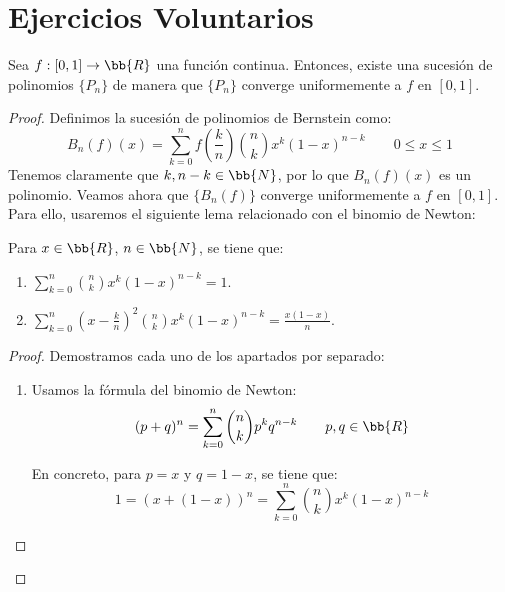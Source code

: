 \chapter{Ejercicios Voluntarios}

\begin{teo}
    Sea $f:[0,1]\to \bb{R}$ una función continua. Entonces, existe una sucesión de polinomios $\{P_n\}$ de manera que $\{P_n\}$ converge uniformemente a $f$ en $[0,1]$.
\end{teo}
\begin{proof}
    Definimos la sucesión de polinomios de Bernstein como:
    \begin{equation*}
        B_n(f)(x) = \sum_{k=0}^n f\left(\frac{k}{n}\right)\binom{n}{k} x^k(1-x)^{n-k}
        \qquad 0\leq x\leq 1
    \end{equation*}
    Tenemos claramente que $k, n-k\in \bb{N}$, por lo que $B_n(f)(x)$ es un polinomio.
    Veamos ahora que $\{B_n(f)\}$ converge uniformemente a $f$ en $[0,1]$. Para ello, usaremos el siguiente lema
    relacionado con el binomio de Newton:
    \begin{lema}\label{lema:AproxWeierstrass}
        Para $x\in \bb{R}$, $n\in \bb{N}$, se tiene que:
        \begin{enumerate}
            \item $\displaystyle \sum_{k=0}^n \binom{n}{k} x^k(1-x)^{n-k} = 1$.
            \item $\displaystyle \sum_{k=0}^n \left(x-\frac{k}{n}\right)^2 \binom{n}{k} x^k(1-x)^{n-k} = \frac{x(1-x)}{n}$.
        \end{enumerate}
        \begin{proof}
            Demostramos cada uno de los apartados por separado:
            \begin{enumerate}
                \item Usamos la fórmula del binomio de Newton:
                \begin{equation}\label{eq:BinomioNewton}
                    (p+q)^n = \sum_{k=0}^n \binom{n}{k} p^k q^{n-k} \qquad p,q\in \bb{R}
                \end{equation}

                En concreto, para $p=x$ y $q=1-x$, se tiene que:
                \begin{equation}\label{eq:BinomioNewtonSolo}
                    1 = (x+(1-x))^n = \sum_{k=0}^n \binom{n}{k} x^k(1-x)^{n-k}
                \end{equation}


\end{enumerate}
\end{proof}
\end{lema}
\end{proof}
